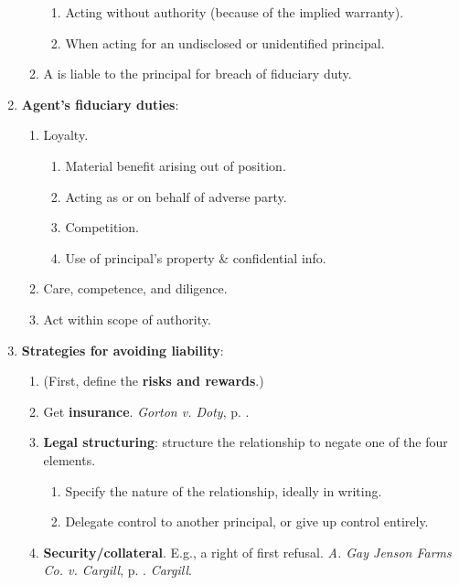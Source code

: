 \begin{enumerate}
\begin{enumerate}
        \begin{enumerate}
            \item Acting without authority (because of the implied warranty).
            \item When acting for an undisclosed or unidentified principal.
        \end{enumerate}
        \item A is liable to the principal for breach of fiduciary duty.
    \end{enumerate}
    \item \textbf{Agent's fiduciary duties}:
    \begin{enumerate}
        \item Loyalty.
        \begin{enumerate}
            \item Material benefit arising out of position.
            \item Acting as or on behalf of adverse party.
            \item Competition.
            \item Use of principal's property \& confidential info.
        \end{enumerate}
        \item Care, competence, and diligence.
        \item Act within scope of authority.
    \end{enumerate}
    \item \textbf{Strategies for avoiding liability}:
    \begin{enumerate}
        \item (First, define the \textbf{risks and rewards}.)
        \item Get \textbf{insurance}. \emph{Gorton v. Doty}, p.
        \pageref{subsub:gorton}.
        \item \textbf{Legal structuring}: structure the relationship to negate 
        one of the four elements.
        \begin{enumerate}
            \item Specify the nature of the relationship, ideally in writing.
            \item Delegate control to another principal, or give up control 
            entirely.
        \end{enumerate}
        \item \textbf{Security/collateral}. E.g., a right of first refusal. 
        \emph{A. Gay Jenson Farms Co. v. Cargill}, p.  
        \pageref{subsub:cargill}. \emph{Cargill}.

\end{enumerate}
\end{enumerate}
